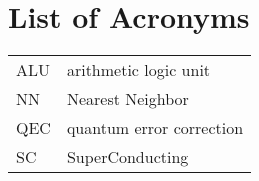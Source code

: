 \chapter*{List of Acronyms}

\begin{table}[ht]
\centering
\begin{tabular}{ll}
ALU & arithmetic logic unit\\
NN & Nearest Neighbor\\
QEC & quantum error correction\\
SC & SuperConducting\\
\end{tabular}
\end{table}




